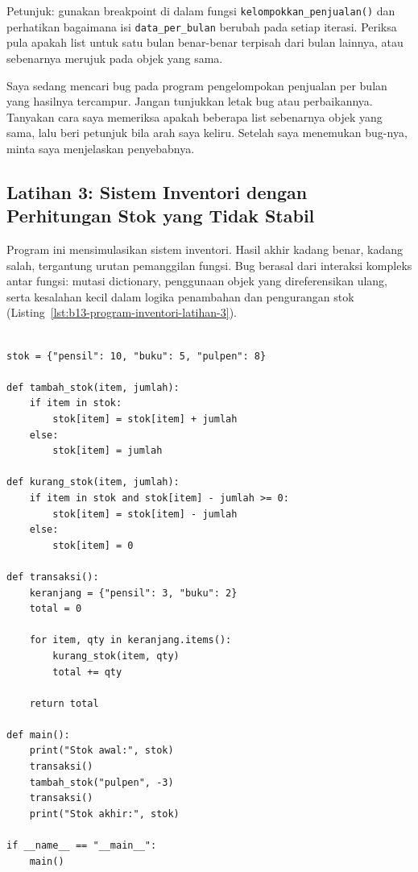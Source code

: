 Petunjuk: gunakan breakpoint di dalam fungsi \texttt{kelompokkan\_penjualan()} dan perhatikan bagaimana isi \texttt{data\_per\_bulan} berubah pada setiap iterasi. Periksa pula apakah list untuk satu bulan benar-benar terpisah dari bulan lainnya, atau sebenarnya merujuk pada objek yang sama.

\begin{promptterarah}
Saya sedang mencari bug pada program pengelompokan penjualan per bulan yang hasilnya tercampur. Jangan tunjukkan letak bug atau perbaikannya. Tanyakan cara saya memeriksa apakah beberapa list sebenarnya objek yang sama, lalu beri petunjuk bila arah saya keliru. Setelah saya menemukan bug-nya, minta saya menjelaskan penyebabnya.
\end{promptterarah}


\subsection*{Latihan 3: Sistem Inventori dengan Perhitungan Stok yang Tidak Stabil}

Program ini mensimulasikan sistem inventori. Hasil akhir kadang benar, kadang salah, tergantung urutan pemanggilan fungsi. Bug berasal dari interaksi kompleks antar fungsi: mutasi dictionary, penggunaan objek yang direferensikan ulang, serta kesalahan kecil dalam logika penambahan dan pengurangan stok (Listing~\ref{lst:b13-program-inventori-latihan-3}).

\begin{lstlisting}[style=PythonStyle, caption={Program inventori untuk Latihan 3}, label={lst:b13-program-inventori-latihan-3}]

stok = {"pensil": 10, "buku": 5, "pulpen": 8}

def tambah_stok(item, jumlah):
    if item in stok:
        stok[item] = stok[item] + jumlah    
    else:
        stok[item] = jumlah

def kurang_stok(item, jumlah):
    if item in stok and stok[item] - jumlah >= 0:
        stok[item] = stok[item] - jumlah
    else:
        stok[item] = 0     

def transaksi():
    keranjang = {"pensil": 3, "buku": 2}
    total = 0

    for item, qty in keranjang.items():
        kurang_stok(item, qty)
        total += qty

    return total

def main():
    print("Stok awal:", stok)
    transaksi()
    tambah_stok("pulpen", -3)   
    transaksi()
    print("Stok akhir:", stok)

if __name__ == "__main__":
    main()
\end{lstlisting}

